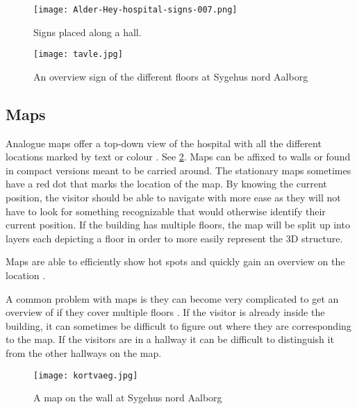 \begin{figure}
\centering
  \begin{minipage}{0.45\textwidth}
    \centering
    \texttt{[image: Alder-Hey-hospital-signs-007.png]}
    \caption{Signs placed along a hall. \cite{signs_hospital}} \label{fig:signs1}
  \end{minipage}
  \hfill
  \begin{minipage}{0.45\textwidth}
    \centering
    \texttt{[image: tavle.jpg]}
    \caption{An overview sign of the different floors at Sygehus nord Aalborg} \label{fig:signs2}
  \end{minipage}
  \end{figure}

\subsection{Maps} \label{sub:map}
Analogue maps \cite{map} offer a top-down view of the hospital with all the different locations marked by text or colour \cite{art_Osborne}. See \cref{fig:map}. Maps can be affixed to walls or found in compact versions meant to be carried around. The stationary maps sometimes have a red dot that marks the location of the map. By knowing the current position, the visitor should be able to navigate with more ease \cite{map_survey} as they will not have to look for something recognizable that would otherwise identify their current position. If the building has multiple floors, the map will be split up into layers each depicting a floor in order to more easily represent the 3D structure.

Maps are able to efficiently show hot spots and quickly gain an overview on the location \cite{pros_analog_map}.

A common problem with maps is they can become very complicated to get an overview of if they cover multiple floors \cite{map_confusing}. If the visitor is already inside the building, it can sometimes be difficult to figure out where they are corresponding to the map. If the visitors are in a hallway it can be difficult to distinguish it from the other hallways on the map.

  \begin{figure}[ht!]
  \centering
  \texttt{[image: kortvaeg.jpg]}
  \caption{A map on the wall at Sygehus nord Aalborg}
  \label{fig:map}
  \end{figure}

